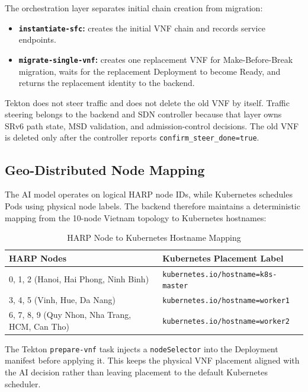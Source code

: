 \documentclass[12pt, a4paper, reqno, oneside]{book}
\begin{document}
The orchestration layer separates initial chain creation from migration:
\begin{itemize}
    \item \textbf{\texttt{instantiate-sfc}:} creates the initial VNF chain and records service endpoints.
    \item \textbf{\texttt{migrate-single-vnf}:} creates one replacement VNF for Make-Before-Break migration, waits for the replacement Deployment to become Ready, and returns the replacement identity to the backend.
\end{itemize}

Tekton does not steer traffic and does not delete the old VNF by itself. Traffic steering belongs to the backend and SDN controller because that layer owns SRv6 path state, MSD validation, and admission-control decisions. The old VNF is deleted only after the controller reports \texttt{confirm\_steer\_done=true}.

\subsection{Geo-Distributed Node Mapping}
The AI model operates on logical HARP node IDs, while Kubernetes schedules Pods using physical node labels. The backend therefore maintains a deterministic mapping from the 10-node Vietnam topology to Kubernetes hostnames:

\begin{table}[H]
\centering
\caption{HARP Node to Kubernetes Hostname Mapping}
\label{table:ai_k8s_mapping}
\begin{tabular}{ll}
\toprule
\textbf{HARP Nodes} & \textbf{Kubernetes Placement Label} \\
\midrule
0, 1, 2 (Hanoi, Hai Phong, Ninh Binh) & \texttt{kubernetes.io/hostname=k8s-master} \\
3, 4, 5 (Vinh, Hue, Da Nang) & \texttt{kubernetes.io/hostname=worker1} \\
6, 7, 8, 9 (Quy Nhon, Nha Trang, HCM, Can Tho) & \texttt{kubernetes.io/hostname=worker2} \\
\bottomrule
\end{tabular}
\end{table}

The Tekton \texttt{prepare-vnf} task injects a \texttt{nodeSelector} into the Deployment manifest before applying it. This keeps the physical VNF placement aligned with the AI decision rather than leaving placement to the default Kubernetes scheduler.
\end{document}
